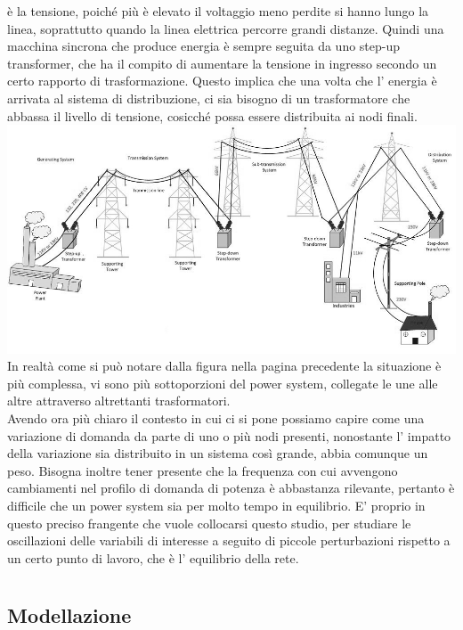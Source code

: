 \documentclass[Lau,noexaminfo]{sapthesis}
\begin{document}
	è la tensione, poiché più è elevato il voltaggio meno perdite si hanno lungo la linea, soprattutto quando la linea elettrica percorre grandi distanze. Quindi una macchina
	sincrona che produce energia è sempre seguita da uno step-up transformer, che ha il compito di aumentare la tensione in ingresso secondo un certo rapporto di trasformazione.
	Questo implica che una volta che l' energia è arrivata al sistema di distribuzione, ci sia bisogno di un trasformatore che abbassa il livello di tensione, cosicché possa essere
	distribuita ai nodi finali.\\
	\includegraphics[height=0.50\textheight,angle=-90]{trasmissione}\\
	In realtà come si può notare dalla figura nella pagina precedente
	la situazione è più complessa, vi sono più sottoporzioni del power system, collegate le une alle altre attraverso altrettanti trasformatori.\\
	Avendo ora più chiaro il contesto in cui ci si pone possiamo capire come una variazione di domanda da parte di uno o più nodi presenti, nonostante l' impatto della
	variazione sia distribuito in un sistema così grande, abbia comunque un peso. Bisogna inoltre tener presente che la frequenza con cui avvengono cambiamenti nel profilo
	di domanda di potenza è abbastanza rilevante, pertanto è difficile che un power system sia per molto tempo in equilibrio. E' proprio in questo preciso frangente che vuole 
	collocarsi questo studio, per studiare le oscillazioni delle variabili di interesse a seguito di piccole perturbazioni rispetto a un certo punto di lavoro, che è l' equilibrio 
	della rete.
	\chapter{}
	
	\section{Modellazione}
\end{document}
